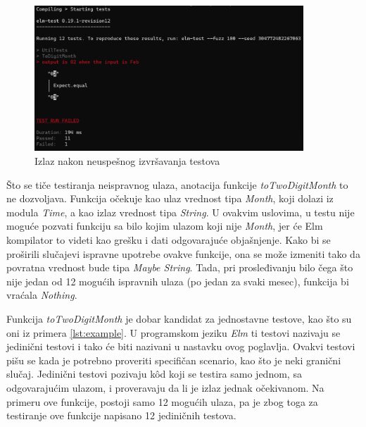 \documentclass[12pt,oneside]{memoir}
\begin{document}
\begin{figure}[!ht]
  \centering
  \includegraphics[width=0.9\textwidth]{elmfail.png}
  \caption{Izlaz nakon neuspešnog izvršavanja testova}
  \label{fig:elmfail}
\end{figure}

\par Što se tiče testiranja neispravnog ulaza, anotacija funkcije \emph{toTwoDigitMonth} to ne dozvoljava. Funkcija očekuje kao ulaz vrednost tipa \emph{Month}, koji dolazi iz modula \emph{Time}, a kao izlaz vrednost tipa \emph{String}. U ovakvim uslovima, u testu nije moguće pozvati funkciju sa bilo kojim ulazom koji nije \emph{Month}, jer će Elm kompilator to videti kao grešku i dati odgovarajuće objašnjenje. Kako bi se proširili slučajevi ispravne upotrebe ovakve funkcije, ona se može izmeniti tako da povratna vrednost bude tipa \emph{Maybe String}. Tada, pri prosleđivanju bilo čega što nije jedan od 12 mogućih ispravnih ulaza (po jedan za svaki mesec), funkcija bi vraćala \emph{Nothing}.
\par Funkcija \emph{toTwoDigitMonth} je dobar kandidat za jednostavne testove, kao što su oni iz primera \ref{lst:example}. U programskom jeziku \emph{Elm} ti testovi nazivaju se jedinični testovi i tako će biti nazivani u nastavku ovog poglavlja. Ovakvi testovi pišu se kada je potrebno proveriti specifičan scenario, kao što je neki granični slučaj. Jedinični testovi pozivaju k\^{o}d koji se testira samo jednom, sa odgovarajućim ulazom, i proveravaju da li je izlaz jednak očekivanom. Na primeru ove funkcije, postoji samo 12 mogućih ulaza, pa je zbog toga za testiranje ove funkcije napisano 12 jediničnih testova. 
\end{document}

